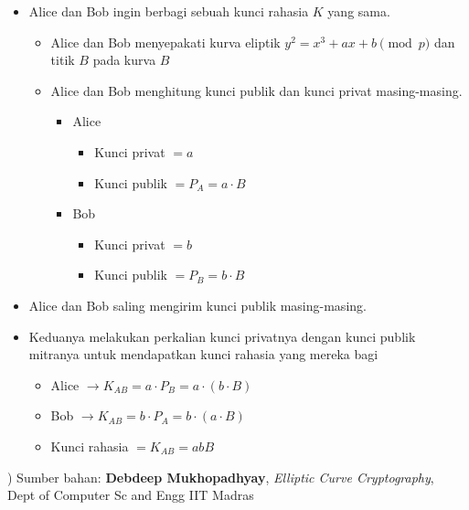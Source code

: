 \documentclass{article}
\begin{document}
\begin{itemize}
    \item Alice dan Bob ingin berbagi sebuah kunci rahasia $K$ yang sama.
    \begin{itemize}
        \item Alice dan Bob menyepakati kurva eliptik $y^2 = x^3 + ax + b \pmod{p}$ dan titik $B$ pada kurva $B$
        \item Alice dan Bob menghitung kunci publik dan kunci privat masing-masing.
        \begin{itemize}
            \item Alice
            \begin{itemize}
                \item Kunci privat $= a$
                \item Kunci publik $= P_A = a \cdot B$
            \end{itemize}
            \item Bob
            \begin{itemize}
                \item Kunci privat $= b$
                \item Kunci publik $= P_B = b \cdot B$
            \end{itemize}
        \end{itemize}
    \end{itemize}
    \item Alice dan Bob saling mengirim kunci publik masing-masing.
    \item Keduanya melakukan perkalian kunci privatnya dengan kunci publik mitranya untuk mendapatkan kunci rahasia yang mereka bagi
    \begin{itemize}
        \item Alice $\rightarrow K_{AB} = a \cdot P_B = a \cdot (b \cdot B)$
        \item Bob $\rightarrow K_{AB} = b \cdot P_A = b \cdot (a \cdot B)$
        \item Kunci rahasia $= K_{AB} = abB$
    \end{itemize}
\end{itemize}

\vfill
\raggedleft
\small *) Sumber bahan: \textbf{Debdeep Mukhopadhyay}, \textit{Elliptic Curve Cryptography}, \\ Dept of Computer Sc and Engg IIT Madras

\newpage

\end{document}
